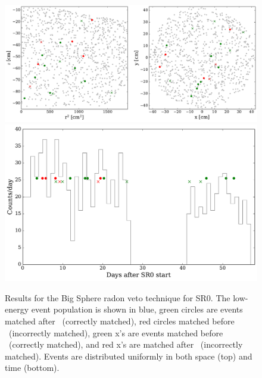 \begin{figure}[htbp]
\centering
    \includegraphics[width=\textwidth]{figures/rnveto/sr0_bs_results_space}
    \includegraphics[width=\textwidth]{figures/rnveto/sr0_bs_results_time}
    \caption{Results for the Big Sphere radon veto technique for SR0. The low-energy event population is shown in blue, green circles are events matched after \Po~(correctly matched), red circles matched before \Po~(incorrectly matched), green x's are events matched before \BiPo~(correctly matched), and red x's are matched after \BiPo~(incorrectly matched). Events are distributed uniformly in both space (top) and time (bottom).}\label{fig:match_parameters0}
\end{figure}

